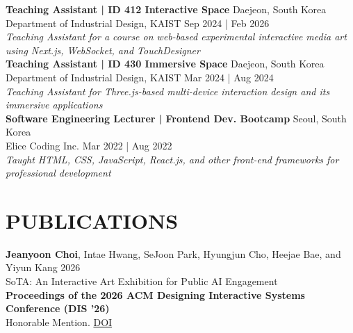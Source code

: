 \documentclass[a4paper,9pt]{extarticle}
\begin{document}
\noindent
\textbf{Teaching Assistant | ID 412 Interactive Space} \hfill Daejeon, South Korea\\ %
{Department of Industrial Design, KAIST} \hfill Sep 2024 | Feb 2026 \\
\textit{Teaching Assistant for a course on web-based experimental interactive media art using Next.js, WebSocket, and TouchDesigner} \hfill \\

\noindent
\textbf{Teaching Assistant | ID 430 Immersive Space} \hfill Daejeon, South Korea\\ %
{Department of Industrial Design, KAIST} \hfill Mar 2024 | Aug 2024 \\
\textit{Teaching Assistant for Three.js-based multi-device interaction design and its immersive applications} \hfill \\

\noindent
\textbf{Software Engineering Lecturer | Frontend Dev. Bootcamp} \hfill Seoul, South Korea\\ %
{Elice Coding Inc.} \hfill Mar 2022 | Aug 2022 \\
\textit{Taught HTML, CSS, JavaScript, React.js, and other front-end frameworks for professional development} \hfill \\



\section*{PUBLICATIONS}
\label{PUBLICATIONS}


\noindent
\textbf{Jeanyoon Choi}, Intae Hwang, SeJoon Park, Hyungjun Cho, Heejae Bae, and Yiyun Kang \hfill 2026\\ %
{SoTA: An Interactive Art Exhibition for Public AI Engagement} \\
\textbf{Proceedings of the 2026 ACM Designing Interactive Systems Conference (DIS '26)} \\ Honorable Mention. \href{https://doi.org/10.1145/3800645.3812889}{DOI} \hfill \\
\end{document}
